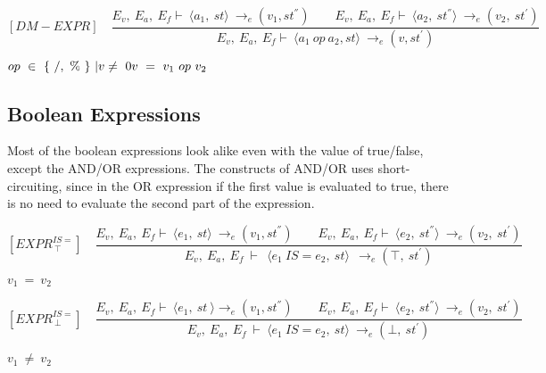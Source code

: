 	
	
	
	
	\[
	[DM-EXPR] \quad
	\dfrac{E_v, \ E_a, \ E_f \vdash \ \langle a_1, \ st \rangle \ \rightarrow_{e} (v_1, st^{''}) \qquad E_v, \ E_a, \ E_f \vdash \ \langle a_2, \ st^{''} \rangle \ \rightarrow_e (v_2, \ st^{'})}{E_v, \ E_a, \ E_f \vdash \ \langle a_1 \ op \ a_2, st \rangle \ \rightarrow_{e} (v, st^{'})}	
	\]
	
	
	\begin{math}		
		op \ \in \ \{ \ /, \ \% \ \} \ | v \not= \ 0 \newline 		
		v \ = \ v_1 \ op \ v_2		
	\end{math} 
	
	
	
	
	
	\subsection{Boolean Expressions}
	
	
	Most of the boolean expressions look alike even with the value of true/false, except the AND/OR expressions. The constructs of AND/OR uses short-circuiting, since in the OR expression if the first value is evaluated to true, there is no need to evaluate the second part of the expression.
	
	
	\[
	[EXPR^{IS=}_{\ \top}] \quad	
	\dfrac{E_v, \ E_a, \ E_f \vdash \ \langle e_1, \ st \rangle \ \rightarrow_e (v_1, st^{''}) \qquad E_v, \ E_a, \ E_f \vdash \ \langle e_2, \ st^{''} \rangle \ \rightarrow_e (v_2, \ st^{'})}{E_v, \ E_a, \ E_f \ \vdash \ \ \langle e_1 \ IS= e_2, \ st \rangle \ \ \rightarrow_e (\top, \ st^{'})}	
	\]
	
	
	\begin{math}		
		v_1 \ = \ v_2 		
	\end{math}
	
	
	
	
	
	\[
	[EXPR^{IS=}_{\ \bot}] \quad	
	\dfrac{E_v, \ E_a, \ E_f \vdash \ \langle e_1, \ st \ \rangle \rightarrow_e (v_1, st^{''}) \qquad E_v, \ E_a, \ E_f \vdash \ \langle e_2, \ st^{''} \rangle \ \rightarrow_e (v_2, \ st^{'})}{E_v, \ E_a, \ E_f \ \vdash \ \langle e_1 \ IS= e_2, \ st \rangle \ \rightarrow_e (\bot, \ st^{'})}	
	\]
	
	
	\begin{math}		
		v_1 \ \not= \ v_2		
	\end{math}
	
	
	
